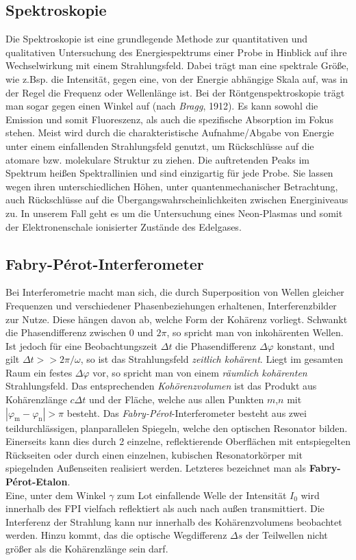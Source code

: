 \documentclass[numbers=noenddot,12pt,a4paper]{scrartcl}
\newcommand{\ix}[1]{_\text{#1}}
\newcommand{\tilt}[1]{\textit{#1}}
\newcommand{\fett}[1]{\textbf{#1}}
\begin{document}
\subsection{Spektroskopie}
Die Spektroskopie ist eine grundlegende Methode zur quantitativen und qualitativen Untersuchung des Energiespektrums einer Probe in Hinblick auf ihre Wechselwirkung mit einem Strahlungsfeld. Dabei trägt man eine spektrale Größe, wie z.Bsp. die Intensität, gegen eine, von der Energie abhängige Skala auf, was in der Regel die Frequenz oder Wellenlänge ist. Bei der Röntgenspektroskopie trägt man sogar gegen einen Winkel auf (nach \tilt{Bragg}, 1912). Es kann sowohl die Emission und somit Fluoreszenz, als auch die spezifische Absorption im Fokus stehen. Meist wird durch die charakteristische Aufnahme/Abgabe von Energie unter einem einfallenden Strahlungsfeld genutzt, um Rückschlüsse auf die atomare bzw. molekulare Struktur zu ziehen. Die auftretenden Peaks im Spektrum heißen Spektrallinien und sind einzigartig für jede Probe. Sie lassen wegen ihren unterschiedlichen Höhen, unter quantenmechanischer Betrachtung, auch Rückschlüsse auf die Übergangswahrscheinlichkeiten zwischen Energiniveaus zu. In unserem Fall geht es um die Untersuchung eines Neon-Plasmas und somit der Elektronenschale ionisierter Zustände des Edelgases.
\subsection{Fabry-Pérot-Interferometer}
Bei Interferometrie macht man sich, die durch Superposition von Wellen gleicher Frequenzen und verschiedener Phasenbeziehungen erhaltenen, Interferenzbilder zur Nutze. Diese hängen davon ab, welche Form der Kohärenz vorliegt. Schwankt die Phasendifferenz  zwischen $0$ und $2\pi$, so spricht man von inkohärenten Wellen. Ist jedoch für eine Beobachtungszeit $\Delta t$ die Phasendifferenz $\Delta \varphi$ konstant, und gilt $\Delta t>>2\pi/\omega$, so ist das Strahlungsfeld \tilt{zeitlich kohärent}. Liegt im gesamten Raum ein festes $\Delta \varphi$ vor, so spricht man von einem \tilt{räumlich kohärenten} Strahlungsfeld. Das entsprechenden \tilt{Kohörenzvolumen} ist das Produkt aus Kohärenzlänge $c\Delta t$ und der Fläche, welche aus allen Punkten $m$,$n$ mit $|\varphi\ix{m}-\varphi\ix{n}|>\pi$ besteht.
\newpage
Das \tilt{Fabry-Pérot}-Interferometer besteht aus zwei teildurchlässigen, planparallelen Spiegeln, welche den optischen Resonator bilden. Einerseits kann dies durch 2 einzelne, reflektierende Oberflächen mit entspiegelten Rückseiten oder durch einen einzelnen, kubischen Resonatorkörper mit spiegelnden Außenseiten realisiert werden. Letzteres bezeichnet man als \fett{Fabry-Pérot-Etalon}.\\
Eine, unter dem Winkel $\gamma$ zum Lot einfallende Welle der Intensität $I\ix{0}$ wird innerhalb des FPI vielfach reflektiert als auch nach außen transmittiert. Die Interferenz der Strahlung kann nur innerhalb des Kohärenzvolumens beobachtet werden. Hinzu kommt, das die optische Wegdifferenz $\Delta s$ der Teilwellen nicht größer als die Kohärenzlänge sein darf.
\end{document}
